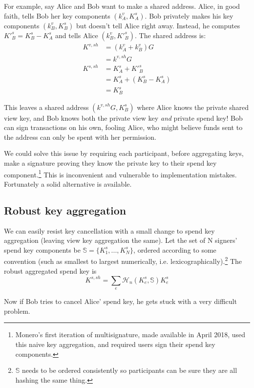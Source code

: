 For example, say Alice and Bob want to make a shared address. Alice, in good faith, tells Bob her key components $(k^{v}_A,K^{s}_A)$. Bob privately makes his key components $(k^{v}_B,K^{s}_B)$ but doesn't tell Alice right away. Instead, he computes $K'^{s}_B = K^{s}_B - K^{s}_A$ and tells Alice $(k^{v}_B,K'^{s}_B)$. The shared address is:
\begin{align*}
    K^{v,sh} &= (k^{v}_A + k^{v}_B) G \\
             &= k^{v,sh} G\\
    K^{s,sh} &= K^{s}_A + K'^{s}_B \\
             &= K^{s}_A + (K^{s}_B - K^{s}_A)\\
             &= K^{s}_B
\end{align*}

This leaves a shared address $(k^{v,sh} G,K^{s}_B)$ where Alice knows the private shared view key, and Bob knows both the private view key {\em and} private spend key! Bob can sign transactions on his own, fooling Alice, who might believe funds sent to the address can only be spent with her permission.

We could solve this issue by requiring each participant, before aggregating keys, make a signature proving they know the private key to their spend key component.\footnote{Monero's first iteration of multisignature, made available in April 2018, used this naive key aggregation, and required users sign their spend key components.} This is inconvenient and vulnerable to implementation mistakes. Fortunately a solid alternative is available.


\subsection{Robust key aggregation}
\label{sec:robust-key-aggregation}

We can easily resist key cancellation with a small change to spend key aggregation (leaving view key aggregation the same). Let the set of N signers' spend key components be $\mathbb{S} = \{K^{s}_1,...,K^{s}_N\}$, ordered according to some convention (such as smallest to largest numerically, i.e. lexicographically).\footnote{$\mathbb{S}$ needs to be ordered consistently so participants can be sure they are all hashing the same thing.} The robust aggregated spend key is
\[K^{s,sh} = \sum_e \mathcal{H}_n(K^{s}_e,\mathbb{S})K^{s}_e\]

Now if Bob tries to cancel Alice' spend key, he gets stuck with a very difficult problem.

